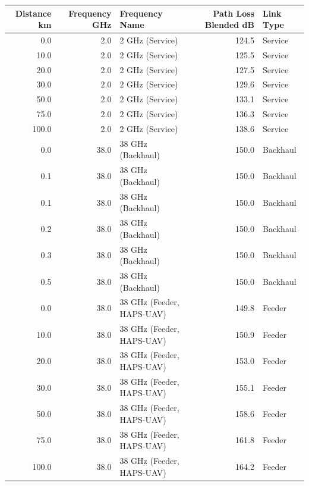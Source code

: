 \centering
\small
\begin{tabular}{rrlrl}
\toprule
Distance km & Frequency GHz & Frequency Name & Path Loss Blended dB & Link Type \\
\midrule
0.0 & 2.0 & 2 GHz (Service) & 124.5 & Service \\
10.0 & 2.0 & 2 GHz (Service) & 125.5 & Service \\
20.0 & 2.0 & 2 GHz (Service) & 127.5 & Service \\
30.0 & 2.0 & 2 GHz (Service) & 129.6 & Service \\
50.0 & 2.0 & 2 GHz (Service) & 133.1 & Service \\
75.0 & 2.0 & 2 GHz (Service) & 136.3 & Service \\
100.0 & 2.0 & 2 GHz (Service) & 138.6 & Service \\
0.0 & 38.0 & 38 GHz (Backhaul) & 150.0 & Backhaul \\
0.1 & 38.0 & 38 GHz (Backhaul) & 150.0 & Backhaul \\
0.1 & 38.0 & 38 GHz (Backhaul) & 150.0 & Backhaul \\
0.2 & 38.0 & 38 GHz (Backhaul) & 150.0 & Backhaul \\
0.3 & 38.0 & 38 GHz (Backhaul) & 150.0 & Backhaul \\
0.5 & 38.0 & 38 GHz (Backhaul) & 150.0 & Backhaul \\
0.0 & 38.0 & 38 GHz (Feeder, HAPS-UAV) & 149.8 & Feeder \\
10.0 & 38.0 & 38 GHz (Feeder, HAPS-UAV) & 150.9 & Feeder \\
20.0 & 38.0 & 38 GHz (Feeder, HAPS-UAV) & 153.0 & Feeder \\
30.0 & 38.0 & 38 GHz (Feeder, HAPS-UAV) & 155.1 & Feeder \\
50.0 & 38.0 & 38 GHz (Feeder, HAPS-UAV) & 158.6 & Feeder \\
75.0 & 38.0 & 38 GHz (Feeder, HAPS-UAV) & 161.8 & Feeder \\
100.0 & 38.0 & 38 GHz (Feeder, HAPS-UAV) & 164.2 & Feeder \\
\bottomrule
\end{tabular}
